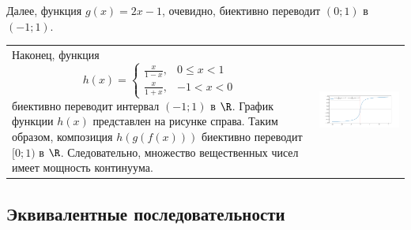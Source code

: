 \begin{enumerate}
Далее, функция $g(x)=2x-1$, очевидно, биективно переводит $(0;1)$ в $(-1;1)$.
\end{enumerate}

\hspace{-13mm}\begin{tabular}{ll}
\begin{minipage}{0.5\linewidth}
\quad Наконец, функция
$$
h(x)=\begin{cases}
\frac{x}{1-x}, & 0\le x<1 \\
\frac{x}{1+x}, & -1<x<0 
\end{cases}
$$
биективно переводит интервал $(-1;1)$ в $\R$. График функции $h(x)$ представлен на рисунке справа.
Таким образом, композиция $h(g(f(x)))$ биективно переводит $[0;1)$ в $\R$. 
Следовательно, множество вещественных чисел имеет мощность континуума.

\end{minipage}
&
\begin{minipage}{0.6\linewidth}
\includegraphics[scale=0.5]{interval.png}
\end{minipage}
\end{tabular}




\subsection*{Эквивалентные последовательности}

